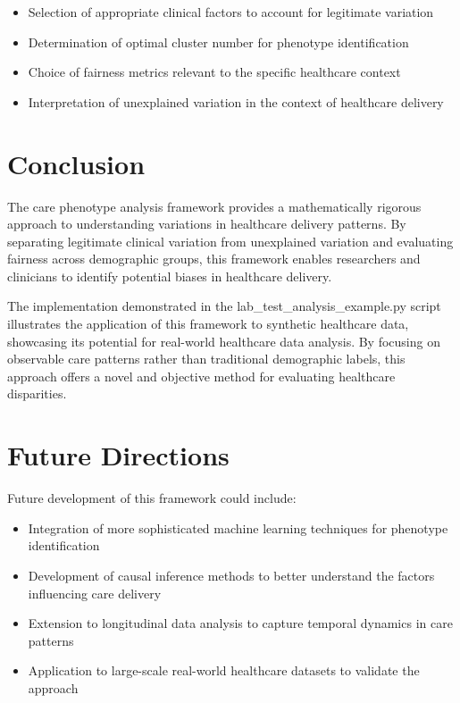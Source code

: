 \documentclass[12pt]{article}
\begin{document}
\begin{itemize}
    \item Selection of appropriate clinical factors to account for legitimate variation
    \item Determination of optimal cluster number for phenotype identification
    \item Choice of fairness metrics relevant to the specific healthcare context
    \item Interpretation of unexplained variation in the context of healthcare delivery
\end{itemize}

\section{Conclusion}

The care phenotype analysis framework provides a mathematically rigorous approach to understanding variations in healthcare delivery patterns. By separating legitimate clinical variation from unexplained variation and evaluating fairness across demographic groups, this framework enables researchers and clinicians to identify potential biases in healthcare delivery.

The implementation demonstrated in the lab\_test\_analysis\_example.py script illustrates the application of this framework to synthetic healthcare data, showcasing its potential for real-world healthcare data analysis. By focusing on observable care patterns rather than traditional demographic labels, this approach offers a novel and objective method for evaluating healthcare disparities.

\section{Future Directions}

Future development of this framework could include:

\begin{itemize}
    \item Integration of more sophisticated machine learning techniques for phenotype identification
    \item Development of causal inference methods to better understand the factors influencing care delivery
    \item Extension to longitudinal data analysis to capture temporal dynamics in care patterns
    \item Application to large-scale real-world healthcare datasets to validate the approach
\end{itemize}
\end{document}
